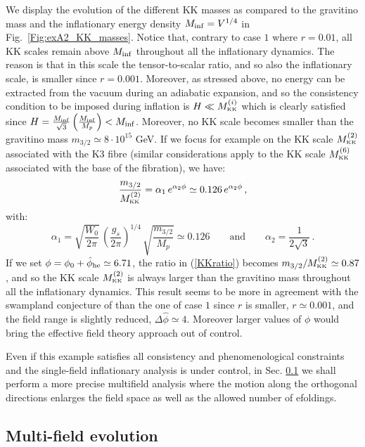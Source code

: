 \documentclass[11pt,a4paper]{article}
\newcommand{\be}{\begin{equation}}
\newcommand{\ee}{\end{equation}}
\def\KK{{\scriptscriptstyle \rm KK}}
\begin{document}
We display the evolution of the different KK masses as compared to the gravitino mass and the inflationary energy density $M_{\rm inf} = V^{1/4}$ in Fig.~\ref{Fig:exA2_KK_masses}. Notice that, contrary to case $1$ where $r=0.01$, all KK scales remain above $M_{\rm inf}$ throughout all the inflationary dynamics. The reason is that in this scale the tensor-to-scalar ratio, and so also the inflationary scale, is smaller since $r=0.001$. Moreover, as stressed above, no energy can be extracted from the vacuum during an adiabatic expansion, and so the consistency condition to be imposed during inflation is $H\ll M_\KK^{(i)}$ which is clearly satisfied since $H = \frac{M_{\rm inf}}{\sqrt{3}}\left(\frac{M_{\rm inf}}{M_p}\right) < M_{\rm inf}$. Moreover, no KK scale becomes smaller than the gravitino mass $m_{3/2} \simeq 8 \cdot 10^{15}$ GeV. If we focus for example on the KK scale $M_\KK^{(2)}$ associated with the K3 fibre (similar considerations apply to the KK scale $M_\KK^{(6)}$ associated with the base of the fibration), we have:
\be
\frac{m_{3/2}}{M_\KK^{(2)}} = \alpha_1\,e^{\alpha_2 \phi}\simeq 0.126\,e^{\alpha_2 \phi}\,,
\label{KKratio}
\ee
with:
\be
\alpha_1 = \sqrt{\frac{W_0}{2\pi}}\,\left(\frac{g_s}{2\pi}\right)^{1/4}\,\sqrt{\frac{m_{3/2}}{M_p}}\simeq 0.126 \qquad\text{and}\qquad \alpha_2 = \frac{1}{2\sqrt{3}}\,.
\ee
If we set $\phi=\phi_0 + \hat\phi_{\rm he} \simeq 6.71$, the ratio in (\ref{KKratio}) becomes $m_{3/2}/M_\KK^{(2)} \simeq 0.87$, and so the KK scale $M_\KK^{(2)}$ is always larger than the gravitino mass throughout all the inflationary dynamics. This result seems to be more in agreement with the swampland conjecture of \cite{Klaewer:2016kiy, Blumenhagen:2017cxt} than the one of case $1$ since $r$ is smaller, $r\simeq 0.001$, and the field range is slightly reduced, $\Delta \hat\phi\simeq 4$. Moreover larger values of $\phi$ would bring the effective field theory approach out of control. 

Even if this example satisfies all consistency and phenomenological constraints and the single-field inflationary analysis is under control, in Sec. \ref{Multi} we shall perform a more precise multifield analysis where the motion along the orthogonal directions enlarges the field space as well as the allowed number of efoldings.


\subsection{Multi-field evolution}
\label{Multi}
\end{document}
